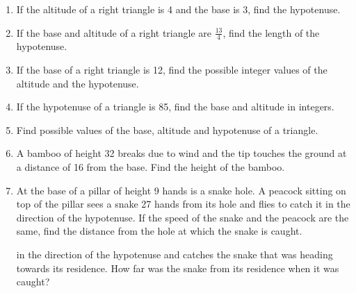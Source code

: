 \begin{enumerate}[label=\thechapter.\arabic*,ref=\thechapter.\theenumi]
\item If the altitude of a right triangle is 4 and the base is 3, find the hypotenuse.
\item If the base and altitude of a right triangle are $\frac{13}{4}$, find the length of the hypotenuse.
\item If the base of a right triangle is 12, find the possible integer values of the altitude and the hypotenuse.
\item If the hypotenuse of a triangle is 85, find the base and altitude in integers.
\item Find possible values of the base, altitude and hypotenuse of a triangle.
\item A bamboo of height 32 breaks due to wind and the tip touches the ground at a distance of 16 from the base.  Find the height of the bamboo.
\item At the base of a pillar of height 9 hands is a snake hole.  A peacock sitting on top of the pillar sees a snake 27 hands from its hole and flies to catch it
	in the direction of the hypotenuse.  If the speed of the snake and the peacock are the same, find the distance from the hole at which the snake is caught.

	in the direction of the hypotenuse
	and catches the snake that was heading towards its residence.  How far was the snake from its residence when it was caught?

	\iffalse
	\begin{table}[!ht]
		\centering
		
		\caption{}
		\label{tab:currency}
	\end{table}
	\fi
\end{enumerate}
